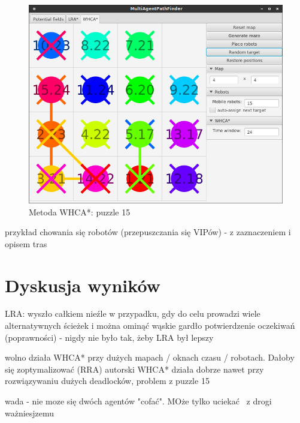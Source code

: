 \begin{figure}
	\centering
	\includegraphics[width=0.8\columnwidth]{img/robopath/puzzle-15}
	\caption{Metoda WHCA*: puzzle 15}
	\label{fig:test-puzzle-15}
\end{figure}

przykład chowania się robotów (przepuszczania się VIPów) - z zaznaczeniem i opisem tras

\section{Dyskusja wyników}
LRA: wyszło całkiem nieźle w przypadku, gdy do celu prowadzi wiele alternatywnych ścieżek i można ominąć wąskie gardło
potwierdzenie oczekiwań (poprawności) - nigdy nie było tak, żeby LRA był lepszy

wolno działa WHCA* przy dużych mapach / oknach czasu / robotach. Dałoby się zoptymalizować (RRA)
autorski WHCA* działa dobrze nawet przy rozwiązywaniu dużych deadlocków, problem z puzzle 15

wada - nie moze się dwóch agentów "cofać". MOże tylko uciekać  z drogi ważniesjzemu